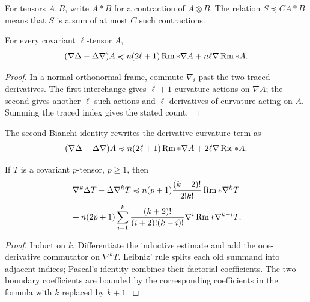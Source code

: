 For tensors \(A,B\), write \(A*B\) for a contraction of \(A\otimes B\).
The relation \(S\preccurlyeq C A*B\) means that \(S\) is a sum of at most
\(C\) such contractions.

\begin{lemma}
\label{lem:chow-ii-nabla-laplacian-commutator}
For every covariant \(\ell\)-tensor \(A\),
\[
 (\nabla\Delta-\Delta\nabla)A
 \preccurlyeq n(2\ell+1)\operatorname{Rm}*\nabla A+n\ell\nabla\operatorname{Rm}*A.
\]
\end{lemma}
\begin{proof}
In a normal orthonormal frame, commute \(\nabla_i\) past the two traced
derivatives.  The first interchange gives \(\ell+1\) curvature actions on
\(\nabla A\); the second gives another \(\ell\) such actions and \(\ell\)
derivatives of curvature acting on \(A\).  Summing the traced index gives the
stated count.
\end{proof}

\begin{remark}
\label{rem:chow-ii-nabla-laplacian-bianchi-form}
The second Bianchi identity rewrites the derivative-curvature term as
\[
 (\nabla\Delta-\Delta\nabla)A
 \preccurlyeq n(2\ell+1)\operatorname{Rm}*\nabla A+2\ell\nabla\operatorname{Ric}*A.
\]
\end{remark}

\begin{lemma}
\label{lem:chow-ii-higher-nabla-laplacian-commutator}
If \(T\) is a covariant \(p\)-tensor, \(p\geq1\), then
\[
 \nabla^k\Delta T-\Delta\nabla^kT
 \preccurlyeq n(p+1)\frac{(k+2)!}{2!k!}\operatorname{Rm}*\nabla^kT
\]
\[
 {}+n(2p+1)\sum_{i=1}^k
 \frac{(k+2)!}{(i+2)!(k-i)!}\nabla^i\operatorname{Rm}*\nabla^{k-i}T.
\]
\end{lemma}
\begin{proof}
Induct on \(k\).  Differentiate the inductive estimate and add the
one-derivative commutator on \(\nabla^kT\).  Leibniz' rule splits each old
summand into adjacent indices; Pascal's identity combines their factorial
coefficients.  The two boundary coefficients are bounded by the corresponding
coefficients in the formula with \(k\) replaced by \(k+1\).
\end{proof}


